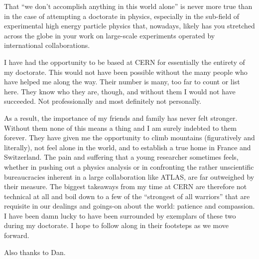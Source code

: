 That ``we don't accomplish anything in this world alone'' is never more true than in the
case of attempting a doctorate in physics, especially in the sub-field of experimental
high energy particle physics that, nowadays, likely has you stretched across the globe
in your work on large-scale experiments operated by international collaborations.

I have had the opportunity to be based at CERN for essentially the entirety of my doctorate.
This would not have been possible without the many people who have helped me along the way.
Their number is many, too far to count or list here.
They know who they are, though, and without them I would not have succeeded.
Not professionally and most definitely not personally.

As a result, the importance of my friends and family has never felt stronger.
Without them none of this means a thing and I am surely indebted to them forever.
They have given me the opportunity to climb mountains (figuratively and literally), not feel alone in the world,
and to establish a true home in France and Switzerland.
The pain and suffering that a young researcher sometimes feels, whether in pushing out a physics analysis or in confronting the
rather unscientific bureaucracies inherent in a large collaboration like ATLAS, are far outweighed by their measure.
The biggest takeaways from my time at CERN are therefore not technical at all and boil down to
a few of the ``strongest of all warriors'' that are requisite in our dealings and goings-on about
the world: patience and compassion.
I have been damn lucky to have been surrounded by exemplars of these two during my doctorate.
I hope to follow along in their footsteps as we move forward.

Also thanks to Dan.
